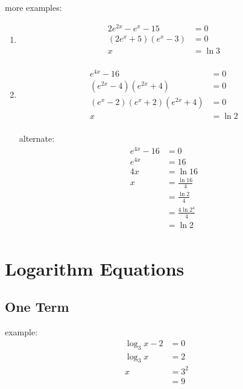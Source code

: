 \documentclass{exam}
\begin{document}
  more examples:
  \begin{enumerate}

    \item 
      \begin{align*}
        2e^{2x} - e^x - 15  &= 0 \\
        (2e^x + 5)(e^x - 3) &= 0 \\
        x                   &= \ln 3 \\
      \end{align*}

    \item
      \begin{align*}
        e^{4x} - 16                    &= 0 \\
        (e^{2x} - 4)(e^{2x} + 4)       &= 0 \\
        (e^x - 2)(e^x + 2)(e^{2x} + 4) &= 0 \\
        x                              &= \ln 2 \\
      \end{align*}

      alternate:
      \begin{align*}
        e^{4x} - 16 &= 0 \\
        e^{4x}      &= 16 \\
        4x          &= \ln 16 \\
        x           &= \frac{\ln 16}{4} \\
                    &= \frac{\ln 2}{4} \\
                    &= \frac{4 \ln 2^4}{4} \\
                    &= \ln 2 \\
      \end{align*}

  \end{enumerate}

  \section{Logarithm Equations}

  \subsection{One Term}

  example:
  \begin{align*}
    \log_3 x - 2 &= 0 \\
    \log_3 x     &= 2 \\
    x            &= 3^2 \\
                 &= 9 \\
  \end{align*}
\end{document}
